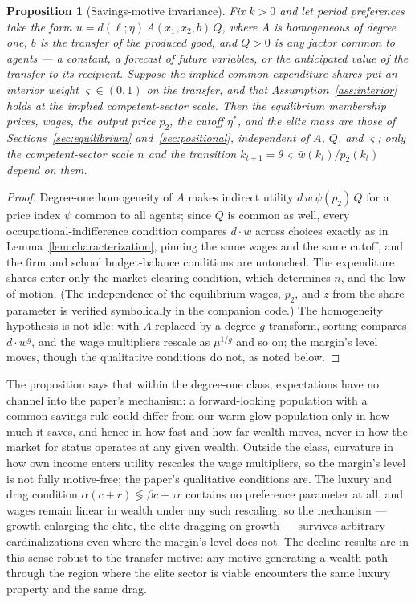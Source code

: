 \documentclass[12pt,letterpaper]{article}
\newtheorem{proposition}{Proposition}
\theoremstyle{definition}
\begin{document}
\begin{proposition}[Savings-motive invariance]\label{prop:invariance}
Fix $k>0$ and let period preferences take the form $u = d(\ell;\eta)\,A(x_1,x_2,b)\,Q$, where $A$ is homogeneous of degree one, $b$ is the transfer of the produced good, and $Q>0$ is any factor common to agents --- a constant, a forecast of future variables, or the anticipated value of the transfer to its recipient.
Suppose the implied common expenditure shares put an interior weight $\varsigma\in(0,1)$ on the transfer, and that Assumption~\ref{ass:interior} holds at the implied competent-sector scale.
Then the equilibrium membership prices, wages, the output price $p_2$, the cutoff $\eta^\ast$, and the elite mass are those of Sections~\ref{sec:equilibrium} and~\ref{sec:positional}, independent of $A$, $Q$, and $\varsigma$; only the competent-sector scale $n$ and the transition $k_{t+1}=\theta\,\varsigma\,\bar{w}(k_t)/p_2(k_t)$ depend on them.
\end{proposition}

\begin{proof}
Degree-one homogeneity of $A$ makes indirect utility $d\,w\,\psi(p_2)\,Q$ for a price index $\psi$ common to all agents; since $Q$ is common as well, every occupational-indifference condition compares $d\cdot w$ across choices exactly as in Lemma~\ref{lem:characterization}, pinning the same wages and the same cutoff, and the firm and school budget-balance conditions are untouched.
The expenditure shares enter only the market-clearing condition, which determines $n$, and the law of motion.
(The independence of the equilibrium wages, $p_2$, and $z$ from the share parameter is verified symbolically in the companion code.)
The homogeneity hypothesis is not idle: with $A$ replaced by a degree-$g$ transform, sorting compares $d\cdot w^{g}$, and the wage multipliers rescale as $\mu^{1/g}$ and so on; the margin's level moves, though the qualitative conditions do not, as noted below.
\end{proof}

The proposition says that within the degree-one class, expectations have no channel into the paper's mechanism: a forward-looking population with a common savings rule could differ from our warm-glow population only in how much it saves, and hence in how fast and how far wealth moves, never in how the market for status operates at any given wealth.
Outside the class, curvature in how own income enters utility rescales the wage multipliers, so the margin's level is not fully motive-free; the paper's qualitative conditions are.
The luxury and drag condition $\alpha(c+r)\lessgtr\beta c+\tau r$ contains no preference parameter at all, and wages remain linear in wealth under any such rescaling, so the mechanism --- growth enlarging the elite, the elite dragging on growth --- survives arbitrary cardinalizations even where the margin's level does not.
The decline results are in this sense robust to the transfer motive: any motive generating a wealth path through the region where the elite sector is viable encounters the same luxury property and the same drag.
\end{document}
